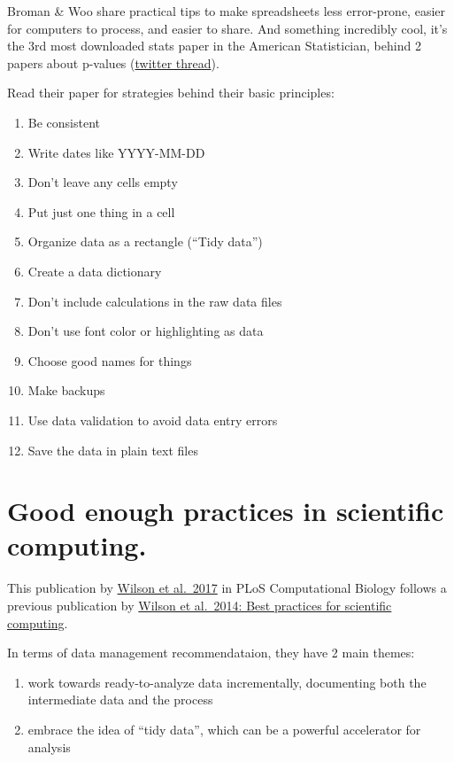 \documentclass[
  letterpaper,
  DIV=11,
  numbers=noendperiod]{scrreprt}
\providecommand{\tightlist}{%
  \setlength{\itemsep}{0pt}\setlength{\parskip}{0pt}}
\begin{document}
Broman \& Woo share practical tips to make spreadsheets less
error-prone, easier for computers to process, and easier to share. And
something incredibly cool, it's the 3rd most downloaded stats paper in
the American Statistician, behind 2 papers about p-values
(\href{https://twitter.com/kwbroman/status/1326678636649394176}{twitter
thread}).

Read their paper for strategies behind their basic principles:

\begin{enumerate}
\def\labelenumi{\arabic{enumi}.}
\tightlist
\item
  Be consistent
\item
  Write dates like YYYY-MM-DD
\item
  Don't leave any cells empty
\item
  Put just one thing in a cell
\item
  Organize data as a rectangle (``Tidy data'')
\item
  Create a data dictionary
\item
  Don't include calculations in the raw data files
\item
  Don't use font color or highlighting as data
\item
  Choose good names for things
\item
  Make backups
\item
  Use data validation to avoid data entry errors
\item
  Save the data in plain text files
\end{enumerate}

\hypertarget{good-enough-practices-in-scientific-computing.}{%
\section{Good enough practices in scientific
computing.}\label{good-enough-practices-in-scientific-computing.}}

This publication by
\href{https://journals.plos.org/ploscompbiol/article?id=10.1371/journal.pcbi.1005510}{Wilson
et al.~2017} in PLoS Computational Biology follows a previous
publication by
\href{https://journals.plos.org/plosbiology/article?id=10.1371/journal.pbio.1001745}{Wilson
et al.~2014: Best practices for scientific computing}.

In terms of data management recommendataion, they have 2 main themes:

\begin{enumerate}
\def\labelenumi{\arabic{enumi}.}
\tightlist
\item
  work towards ready-to-analyze data incrementally, documenting both the
  intermediate data and the process
\item
  embrace the idea of ``tidy data'', which can be a powerful accelerator
  for analysis
\end{enumerate}
\end{document}
